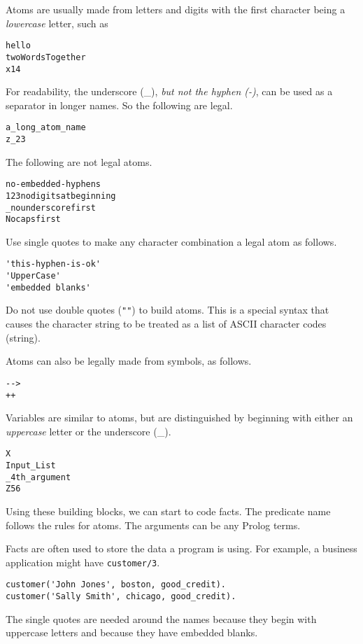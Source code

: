 Atoms are usually made from letters and digits with the first character being a
\emph{lowercase} letter, such as
\begin{verbatim}
hello
twoWordsTogether
x14
\end{verbatim}

For readability, the underscore (\_), \emph{but not the hyphen (-)}, can be used
as a separator in longer names. So the following are legal.
\begin{verbatim}
a_long_atom_name
z_23
\end{verbatim}

The following are not legal atoms.
\begin{verbatim}
no-embedded-hyphens
123nodigitsatbeginning
_nounderscorefirst
Nocapsfirst
\end{verbatim}

Use single quotes to make any character combination a legal atom as follows.
\begin{verbatim}
'this-hyphen-is-ok'
'UpperCase'
'embedded blanks'
\end{verbatim}

Do not use double quotes (\verb|""|) to build atoms. This is a special syntax
that causes the character string to be treated as a list of ASCII character
codes (string).

Atoms can also be legally made from symbols, as follows.
\begin{verbatim}
-->
++
\end{verbatim}

Variables are similar to atoms, but are distinguished by beginning with either
an \emph{uppercase} letter or the underscore (\_).
\begin{verbatim}
X
Input_List
_4th_argument
Z56
\end{verbatim}

Using these building blocks, we can start to code facts. The predicate name
follows the rules for atoms. The arguments can be any Prolog terms.

Facts are often used to store the data a program is using. For example, a
business application might have \verb'customer/3'.
\begin{verbatim}
customer('John Jones', boston, good_credit).
customer('Sally Smith', chicago, good_credit).
\end{verbatim}

The single quotes are needed around the names because they begin with uppercase
letters and because they have embedded blanks.

